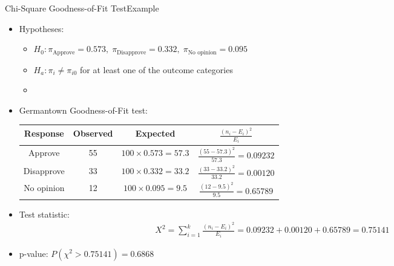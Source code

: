 \documentclass[xcolor=dvipsnames]{beamer}
\begin{document}
\begin{frame}{Chi-Square Goodness-of-Fit Test}{Example}
\begin{itemize}
	\item Hypotheses:
	\begin{itemize}
		\item $H_0: \pi_{\text{Approve}} = 0.573,\; \pi_{\text{Disapprove}} = 0.332,\; \pi_{\text{No opinion}}=0.095$
		\item $H_a: \pi_i \neq \pi_{i0}$ for at least one of the outcome categories
		\item[]
	\end{itemize}
	\item Germantown Goodness-of-Fit test:
	{\scriptsize
	\begin{center}
		\begin{tabular}{cccc}
			\hline
			Response & Observed & Expected & $\frac{(n_i-E_i)^2}{E_i}$ \\ \hline \hline
			Approve & 55 & $100 \times 0.573 = 57.3$ & $\frac{(55-57.3)^2}{57.3} = 0.09232$\\
			Disapprove & 33 & $100 \times 0.332 = 33.2$ & $\frac{(33-33.2)^2}{33.2} = 0.00120$\\
			No opinion & 12 & $100 \times 0.095 = 9.5$ & $\frac{(12-9.5)^2}{9.5}=0.65789$\\ \hline
		\end{tabular}
	\end{center}}
	\vspace{1mm}
	\item Test statistic: 
	\begin{gather*}
	X^2 = \sum_{i=1}^k \frac{(n_i-E_i)^2}{E_i} = 0.09232 + 0.00120 + 0.65789 = 0.75141
	\end{gather*}
	\item p-value: $P(\chi^2 > 0.75141) = 0.6868$
\end{itemize}
\end{frame}
\end{document}
